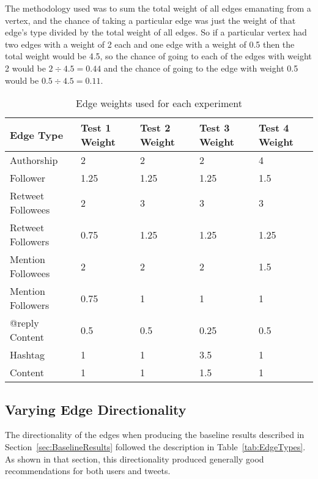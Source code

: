 The methodology used was to sum the total weight of all edges emanating from a vertex, and the chance of taking a particular edge was just the weight of that edge's type divided by the total weight of all edges. So if a particular vertex had two edges with a weight of 2 each and one edge with a weight of  0.5 then the total weight would be 4.5, so the chance of going to each of the edges with weight 2 would be $2 \div 4.5 = 0.44$ and the chance of going to the edge with weight 0.5 would be $0.5 \div 4.5 = 0.11$.


\begin{table}
\centering
\begin{tabular}{l|p{1.5cm}|p{1.5cm}|p{1.5cm}|p{1.5cm}}
{\bf Edge Type} & {\bf Test 1 Weight} & {\bf Test 2 Weight} & {\bf Test 3 Weight} & {\bf Test 4 Weight} \\ \hline
Authorship & 2 & 2 & 2 & 4 \\ \hline
Follower & 1.25 & 1.25 & 1.25 & 1.5 \\ \hline
Retweet Followees & 2 & 3 & 3 & 3 \\ \hline
Retweet Followers & 0.75 & 1.25 & 1.25 & 1.25 \\ \hline
Mention Followees & 2 & 2 & 2 & 1.5 \\ \hline
Mention Followers & 0.75 & 1 & 1 & 1 \\ \hline
@reply Content & 0.5 & 0.5 & 0.25 & 0.5 \\ \hline
Hashtag & 1 & 1 & 3.5 & 1 \\ \hline
Content & 1 & 1 & 1.5 & 1 \\
\end{tabular}
\caption{Edge weights used for each experiment }
\label{tab:EdgeWeightsUsed}
\end{table}




\subsection{Varying Edge Directionality}
\label{sec:VaryingEdgeDirectionality}

The directionality of the edges when producing the baseline results described in Section~\ref{sec:BaselineResults} followed the description in Table~\ref{tab:EdgeTypes}. As shown in that section, this directionality produced generally good recommendations for both users and tweets.

